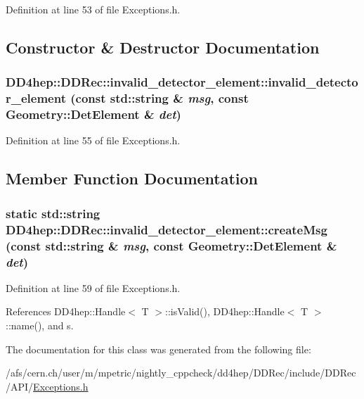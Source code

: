 Definition at line 53 of file Exceptions.h.

\subsection{Constructor \& Destructor Documentation}
\hypertarget{class_d_d4hep_1_1_d_d_rec_1_1invalid__detector__element_af05d70f474fba21d10072fd98971f55e}{
\subsubsection[{invalid\_\-detector\_\-element}]{\setlength{\rightskip}{0pt plus 5cm}DD4hep::DDRec::invalid\_\-detector\_\-element::invalid\_\-detector\_\-element (const std::string \& {\em msg}, \/  const {\bf Geometry::DetElement} \& {\em det})}}
\label{class_d_d4hep_1_1_d_d_rec_1_1invalid__detector__element_af05d70f474fba21d10072fd98971f55e}


Definition at line 55 of file Exceptions.h.

\subsection{Member Function Documentation}
\hypertarget{class_d_d4hep_1_1_d_d_rec_1_1invalid__detector__element_a8e490d00933ab26fc58cac741958ac50}{
\subsubsection[{createMsg}]{\setlength{\rightskip}{0pt plus 5cm}static std::string DD4hep::DDRec::invalid\_\-detector\_\-element::createMsg (const std::string \& {\em msg}, \/  const {\bf Geometry::DetElement} \& {\em det})}}
\label{class_d_d4hep_1_1_d_d_rec_1_1invalid__detector__element_a8e490d00933ab26fc58cac741958ac50}


Definition at line 59 of file Exceptions.h.

References DD4hep::Handle$<$ T $>$::isValid(), DD4hep::Handle$<$ T $>$::name(), and s.

The documentation for this class was generated from the following file:\begin{DoxyCompactItemize}
\item 
/afs/cern.ch/user/m/mpetric/nightly\_\-cppcheck/dd4hep/DDRec/include/DDRec/API/\hyperlink{_d_d_rec_2include_2_d_d_rec_2_a_p_i_2_exceptions_8h}{Exceptions.h}\end{DoxyCompactItemize}
